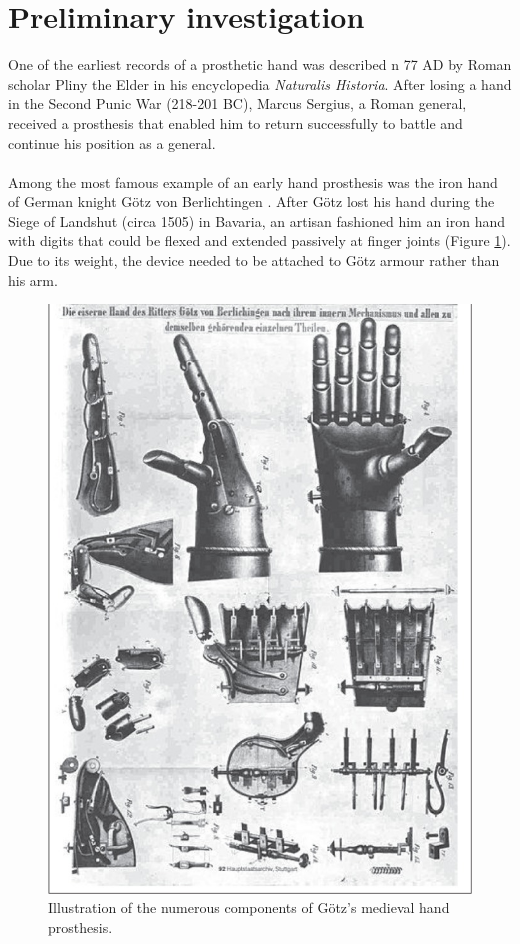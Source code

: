 \documentclass[11pt, a4paper]{article}
\begin{document}
\section{Preliminary investigation}
One of the earliest records of a prosthetic hand was described n 77 AD by Roman scholar Pliny the Elder in his encyclopedia \textit{Naturalis Historia}\cite{natural_history}.
After losing a hand in the Second Punic War (218-201 BC), Marcus Sergius, a Roman general, received a prosthesis that enabled him to return successfully to battle and continue his position as a general.
\\ \\ 
Among the most famous example of an early hand prosthesis was the iron hand of German knight G\"otz von Berlichtingen \cite{historical_prostheses}.
After G\"otz lost his hand during the Siege of Landshut (circa 1505) in Bavaria, an artisan fashioned him an iron hand with digits that could be flexed and extended passively at finger joints (Figure \ref{fig:GotzProsthesis}).
Due to its weight, the device needed to be attached to G\"otz armour rather than his arm. 
\\
\begin{figure}[h]
    \centering
    \includegraphics[scale=0.26]{GotzProsthesis.jpg}
    \caption{Illustration of the numerous components of G\"otz's medieval hand prosthesis.}
    \label{fig:GotzProsthesis}
\end{figure}
\end{document}
